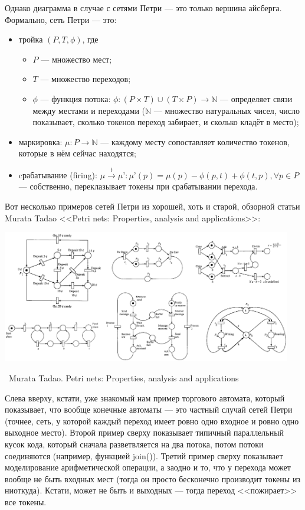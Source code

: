 \documentclass[a5paper]{article}
\newcommand{\attribution}[1] {
    \vspace{-5mm}\begin{flushright}\begin{scriptsize}%
    {\textcopyright\, #1}\end{scriptsize}\end{flushright}
}
\begin{document}
Однако диаграмма в случае с сетями Петри --- это только вершина айсберга. Формально, сеть Петри --- это:

\begin{itemize}
    \item тройка $(P, T, \phi)$, где
    \begin{itemize}
        \item $P$ --- множество мест;
        \item $T$ --- множество переходов;
        \item $\phi$ --- функция потока: $\phi : (P \times T) \cup (T \times P) \rightarrow \mathbb{N}$ --- определяет связи между местами и переходами ($\mathbb{N}$ --- множество натуральных чисел, число показывает, сколько токенов переход забирает, и сколько кладёт в место);
    \end{itemize}
    \item маркировка: $\mu : P \rightarrow \mathbb{N}$ --- каждому месту сопоставляет количество токенов, которые в нём сейчас находятся;
    \item cрабатывание (firing):
    $\mu \xrightarrow{t} \mu’ : \mu’(p) = \mu(p) - \phi(p, t) + \phi(t, p), \forall p \in P$ --- собственно, переклазывает токены при срабатывании перехода.
\end{itemize}

Вот несколько примеров сетей Петри из хорошей, хоть и старой, обзорной статьи Murata Tadao <<Petri nets: Properties, analysis and applications>>:

\begin{center}
    \includegraphics[width=0.95\textwidth]{petriNetExamples.png}
    \attribution{Murata Tadao. Petri nets: Properties, analysis and applications}
\end{center}

Слева вверху, кстати, уже знакомый нам пример торгового автомата, который показывает, что вообще конечные автоматы --- это частный случай сетей Петри (точнее, сеть, у которой каждый переход имеет ровно одно входное и ровно одно выходное место). Второй пример сверху показывает типичный параллельный кусок кода, который сначала разветвляется на два потока, потом потоки соединяются (например, функцией join()). Третий пример сверху показывает моделирование арифметической операции, а заодно и то, что у перехода может вообще не быть входных мест (тогда он просто бесконечно производит токены из ниоткуда). Кстати, может не быть и выходных --- тогда переход <<пожирает>> все токены.
\end{document}
